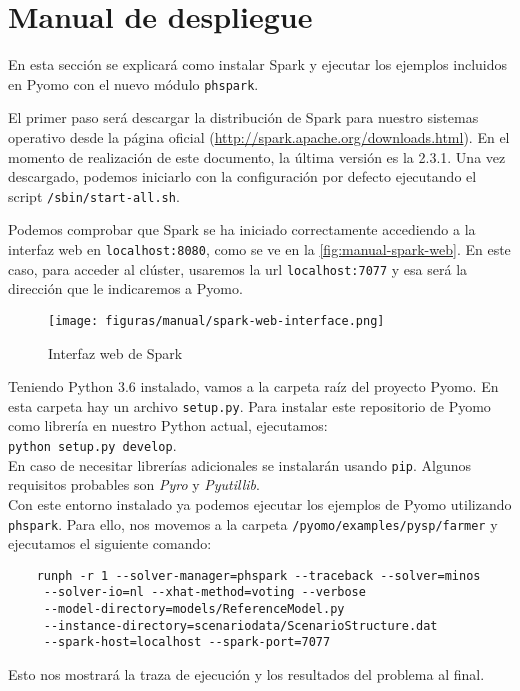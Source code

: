 \chapter{Manual de despliegue}

En esta sección se explicará como instalar Spark y ejecutar los ejemplos incluidos en Pyomo con el nuevo módulo \texttt{phspark}.

El primer paso será descargar la distribución de Spark para nuestro sistemas operativo desde la página oficial (\url{http://spark.apache.org/downloads.html}). En el momento de realización de este documento, la última versión es la 2.3.1. Una vez descargado, podemos iniciarlo con la configuración por defecto ejecutando el script \texttt{/sbin/start-all.sh}.

Podemos comprobar que Spark se ha iniciado correctamente accediendo a la interfaz web en \texttt{localhost:8080}, como se ve en la \autoref{fig:manual-spark-web}. En este caso, para acceder al clúster, usaremos la url \texttt{localhost:7077} y esa será la dirección que le indicaremos a Pyomo.\\

\begin{figure}[H]
    \centerline{\texttt{[image: figuras/manual/spark-web-interface.png]}}
    \caption{Interfaz web de Spark}
    \label{fig:manual-spark-web}
\end{figure}

Teniendo Python 3.6 instalado, vamos a la carpeta raíz del proyecto Pyomo. En esta carpeta hay un archivo \texttt{setup.py}. Para instalar este repositorio de Pyomo como librería en nuestro Python actual, ejecutamos: \\

\texttt{python setup.py develop}. \\

En caso de necesitar librerías adicionales se instalarán usando \texttt{pip}. Algunos requisitos probables son \textit{Pyro} y \textit{Pyutillib}.\\

Con este entorno instalado ya podemos ejecutar los ejemplos de Pyomo utilizando \texttt{phspark}. Para ello, nos movemos a la carpeta \texttt{/pyomo/examples/pysp/farmer} y ejecutamos el siguiente comando:\\

\begin{verbatim}
    runph -r 1 --solver-manager=phspark --traceback --solver=minos
     --solver-io=nl --xhat-method=voting --verbose 
     --model-directory=models/ReferenceModel.py 
     --instance-directory=scenariodata/ScenarioStructure.dat  
     --spark-host=localhost --spark-port=7077
\end{verbatim}

Esto nos mostrará la traza de ejecución y los resultados del problema al final.
